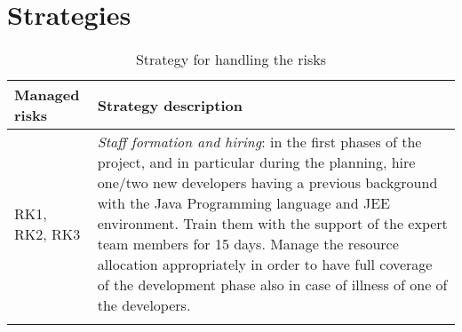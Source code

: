 \section{Strategies}
\begin{longtable}{p{} | p{}}
\textbf{Managed risks} & \textbf{Strategy description} \\ \hline
RK1, RK2, RK3 & \textit{Staff formation and hiring}: in the first phases of the project, and in particular during the planning, hire one/two new developers having a previous background with the Java Programming language and JEE environment. Train them with the support of the expert team members for 15 days. Manage the resource allocation appropriately in order to have full coverage of the development phase also in case of illness of one of the developers. \\ \hline
\caption{Strategy for handling the risks}
\end{longtable}